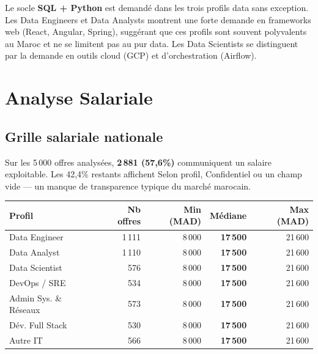 \documentclass[12pt,a4paper]{article}
\begin{document}
\begin{keybox}
Le socle \textbf{SQL + Python} est demandé dans les trois profils data sans exception. Les Data Engineers et Data Analysts montrent une forte demande en frameworks web (React, Angular, Spring), suggérant que ces profils sont souvent polyvalents au Maroc et ne se limitent pas au pur data. Les Data Scientists se distinguent par la demande en outils cloud (GCP) et d'orchestration (Airflow).
\end{keybox}

\section{Analyse Salariale}

\subsection{Grille salariale nationale}

Sur les 5\,000 offres analysées, \textbf{2\,881 (57,6\%)} communiquent un salaire exploitable. Les 42,4\% restants affichent \og{}Selon profil\fg{}, \og{}Confidentiel\fg{} ou un champ vide --- un manque de transparence typique du marché marocain.

\begin{center}
\renewcommand{\arraystretch}{1.3}
\begin{tabularx}{\textwidth}{l r r r r}
\toprule
\textbf{Profil} & \textbf{Nb offres} & \textbf{Min (MAD)} & \textbf{Médiane} & \textbf{Max (MAD)} \\
\midrule
Data Engineer & 1\,111 & 8\,000 & \textbf{17\,500} & 21\,600 \\
Data Analyst & 1\,110 & 8\,000 & \textbf{17\,500} & 21\,600 \\
Data Scientist & 576 & 8\,000 & \textbf{17\,500} & 21\,600 \\
DevOps / SRE & 534 & 8\,000 & \textbf{17\,500} & 21\,600 \\
Admin Sys. \& Réseaux & 573 & 8\,000 & \textbf{17\,500} & 21\,600 \\
Dév. Full Stack & 530 & 8\,000 & \textbf{17\,500} & 21\,600 \\
Autre IT & 566 & 8\,000 & \textbf{17\,500} & 21\,600 \\
\bottomrule
\end{tabularx}
\end{center}
\end{document}
